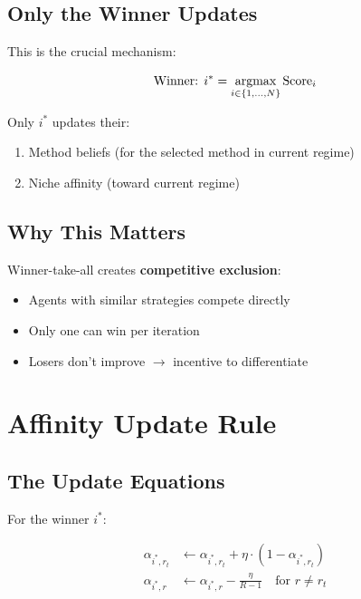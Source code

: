 \documentclass[11pt,a4paper]{article}
\theoremstyle{definition}
\theoremstyle{plain}
\newcommand{\argmax}{\operatornamewithlimits{argmax}}
\begin{document}
\subsection{Only the Winner Updates}

This is the crucial mechanism:

\begin{equation}
\text{Winner: } i^* = \argmax_{i \in \{1,\ldots,N\}} \text{Score}_i
\end{equation}

Only $i^*$ updates their:
\begin{enumerate}
    \item Method beliefs (for the selected method in current regime)
    \item Niche affinity (toward current regime)
\end{enumerate}

\subsection{Why This Matters}

\begin{keypoint}
Winner-take-all creates \textbf{competitive exclusion}:
\begin{itemize}
    \item Agents with similar strategies compete directly
    \item Only one can win per iteration
    \item Losers don't improve $\to$ incentive to differentiate
\end{itemize}
\end{keypoint}

\section{Affinity Update Rule}

\subsection{The Update Equations}

For the winner $i^*$:

\begin{align}
\alpha_{i^*,r_t} &\leftarrow \alpha_{i^*,r_t} + \eta \cdot (1 - \alpha_{i^*,r_t}) \label{eq:affinity-up} \\
\alpha_{i^*,r} &\leftarrow \alpha_{i^*,r} - \frac{\eta}{R-1} \quad \text{for } r \neq r_t \label{eq:affinity-down}
\end{align}
\end{document}
